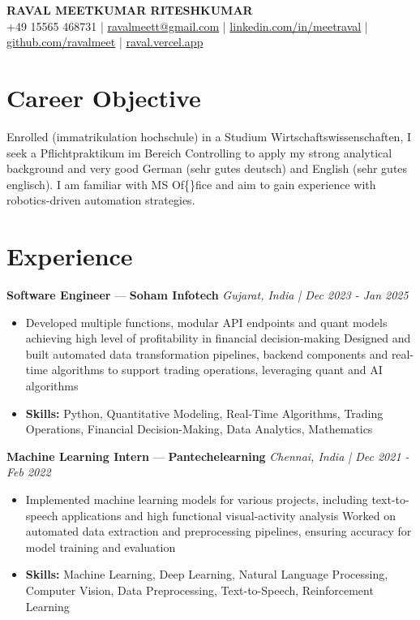 \documentclass[a4paper,10pt]{article}
\begin{document}
\begin{center}
  {\Large\bfseries RAVAL MEETKUMAR RITESHKUMAR}\\[2pt]
  {\small +49 15565 468731 \;|\; \href{mailto:ravalmeett@gmail.com}{ravalmeett@gmail.com} \;|\; \href{https://www.linkedin.com/in/meetraval/}{linkedin.com/in/meetraval} \;|\; \href{https://github.com/ravalmeet}{github.com/ravalmeet} \;|\; \href{https://raval.vercel.app/}{raval.vercel.app}}
\end{center}
\vspace{-3pt}

\section*{Career Objective}
Enrolled (immatrikulation hochschule) in a Studium Wirtschaftswissenschaften, I seek a Pflichtpraktikum im Bereich Controlling to apply my strong analytical background and very good German (sehr gutes deutsch) and English (sehr gutes englisch). I am familiar with MS Of\{\}fice and aim to gain experience with robotics-driven automation strategies.\par

\section*{Experience}
\textbf{Software Engineer} — \textbf{Soham Infotech} \hfill \textit{Gujarat, India \;|\; Dec 2023 - Jan 2025}\par
\vspace{1pt}
\begin{itemize}
  \item Developed multiple functions, modular API endpoints and quant models achieving high level of profitability in financial decision-making Designed and built automated data transformation pipelines, backend components and real-time algorithms to support trading operations, leveraging quant and AI algorithms
  \item \textbf{Skills:} Python, Quantitative Modeling, Real-Time Algorithms, Trading Operations, Financial Decision-Making, Data Analytics, Mathematics
\end{itemize}
\vspace{3pt}
\textbf{Machine Learning Intern} — \textbf{Pantechelearning} \hfill \textit{Chennai, India \;|\; Dec 2021 - Feb 2022}\par
\vspace{1pt}
\begin{itemize}
  \item Implemented machine learning models for various projects, including text-to-speech applications and high functional visual-activity analysis Worked on automated data extraction and preprocessing pipelines, ensuring accuracy for model training and evaluation
  \item \textbf{Skills:} Machine Learning, Deep Learning, Natural Language Processing, Computer Vision, Data Preprocessing, Text-to-Speech, Reinforcement Learning
\end{itemize}
\end{document}
